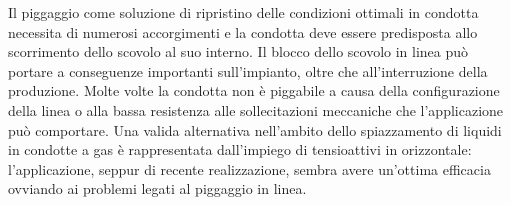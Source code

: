 Il piggaggio come soluzione di ripristino delle condizioni ottimali in condotta necessita di numerosi accorgimenti e la condotta deve essere predisposta allo scorrimento dello scovolo al suo interno. Il blocco dello scovolo in linea può portare a conseguenze importanti sull'impianto, oltre che all'interruzione della produzione. Molte volte la condotta non è piggabile a causa della configurazione della linea o alla bassa resistenza alle sollecitazioni meccaniche che l'applicazione può comportare. Una valida alternativa nell'ambito dello spiazzamento di liquidi in condotte a gas è rappresentata dall'impiego di tensioattivi in orizzontale: l'applicazione, seppur di recente realizzazione, sembra avere un'ottima efficacia ovviando ai problemi legati al piggaggio in linea.
